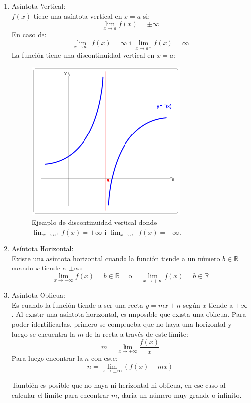 \documentclass[arial,a4paper,print]{article}
\begin{document}
\begin{enumerate}
	\item Asíntota Vertical:\\
	$f(x)$ tiene una asíntota vertical en $x=a$ si:
\begin{equation*}
	\lim_{x\rightarrow a}f(x) = \pm\infty
\end{equation*}
En caso de:
\begin{equation*}
	\lim_{x\rightarrow a^{-}} f(x) = \infty \text{ i } \lim_{x\rightarrow a^{+}} f(x) = \infty
\end{equation*}
La función tiene una discontinuidad vertical en $x=a$:
\begin{figure}[h]
	\centering
	\includegraphics[width=.3\linewidth]{figures/discontinuidad_vertical}
	\caption{Ejemplo de discontinuidad vertical donde $\lim_{x\rightarrow a^{+}} f(x) = +\infty$ i $\lim_{x\rightarrow a^{-}} f(x) = -\infty$.}
	\label{fig:discontinuidadvertical}
\end{figure}

\item Asíntota Horizontal:\\
Existe una asíntota horizontal cuando la función tiende a un número $b\in\mathbb{R}$ cuando $x $ tiende a $\pm\infty$: 
\begin{equation*}
	\lim_{x\rightarrow -\infty} f(x) = b\in\mathbb{R} \quad\text{ o }\quad \lim_{x\rightarrow +\infty} f(x) = b\in\mathbb{R}
\end{equation*}

\item Asíntota Oblicua:\\
Es cuando la función tiende a ser una recta $y = mx + n$ según $x$ tiende a $\pm\infty$. Al existir una asíntota horizontal, es imposible que exista una oblicua. Para poder identificarlas, primero se comprueba que no haya una horizontal y luego se encuentra la $m$ de la recta a través de este límite:
\begin{equation*}
	m = \lim_{x\rightarrow \pm\infty} \frac{f(x)}{x}
\end{equation*}
Para luego encontrar la $n$ con este:
\begin{equation*}
	n = \lim_{x\rightarrow \pm\infty} \left(f(x) - mx\right)
\end{equation*}

También es posible que no haya ni horizontal ni oblicua, en ese caso al calcular el limite para encontrar $m$, daría un número muy grande o infinito. 
	
\end{enumerate}
\end{document}
